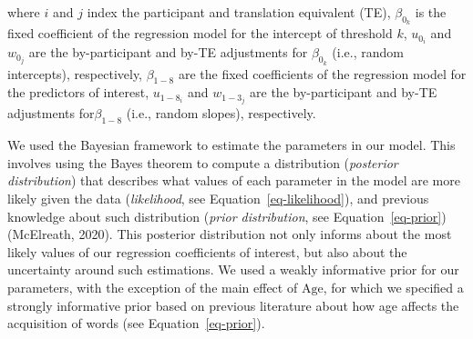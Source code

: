 \documentclass[
  man,
  floatsintext,
  colorlinks=true,linkcolor=blue,citecolor=blue,urlcolor=blue,biblatex]{apa7}
\begin{document}
where \(i\) and \(j\) index the participant and translation equivalent
(TE), \(\beta_{0_k}\) is the fixed coefficient of the regression model
for the intercept of threshold \(k\), \(u_{0_{i}}\) and \(w_{0_{j}}\)
are the by-participant and by-TE adjustments for \(\beta_{0_{k}}\)
(i.e., random intercepts), respectively, \(\beta_{1-8}\) are the fixed
coefficients of the regression model for the predictors of interest,
\(u_{1-8_{i}}\) and \(w_{1-3_{j}}\) are the by-participant and by-TE
adjustments for\(\beta_{1-8}\) (i.e., random slopes), respectively.

We used the Bayesian framework to estimate the parameters in our model.
This involves using the Bayes theorem to compute a distribution
(\emph{posterior distribution}) that describes what values of each
parameter in the model are more likely given the data
(\emph{likelihood}, see Equation~\ref{eq-likelihood}), and previous
knowledge about such distribution (\emph{prior distribution}, see
Equation~\ref{eq-prior}) (McElreath, 2020). This posterior distribution
not only informs about the most likely values of our regression
coefficients of interest, but also about the uncertainty around such
estimations. We used a weakly informative prior for our parameters, with
the exception of the main effect of \(\text{Age}\), for which we
specified a strongly informative prior based on previous literature
about how age affects the acquisition of words (see
Equation~\ref{eq-prior}).
\end{document}
